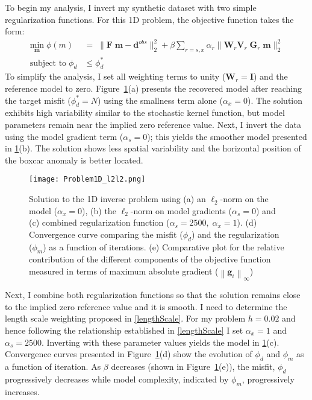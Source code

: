 To begin my analysis, I invert my synthetic dataset with two simple regularization functions. For this 1D problem, the objective function takes the form:
\begin{equation}
\begin{split}
\underset{\mathbf{m}}{\text{min}}\; \phi(m) & = \; \|\mathbf{F}\;\mathbf{m} - \mathbf{d}^{obs}\|_2^2 + \beta \sum_{r=s,x} \alpha_r \|\mathbf{W}_r \mathbf{V}_r \;\mathbf{G}_r \;\mathbf{m}\|_2^2 \\
\text{subject to} \; \phi_d & \leq \phi_d^* \;
\end{split}\label{1DLineObjFun}
\end{equation}
To simplify the analysis, I set all weighting terms to unity ($\mathbf{W}_r = \mathbf{I}$) and the reference model to zero.
Figure~\ref{Problem1D_l2Result}(a) presents the recovered model after reaching the target misfit ($\phi_d^*=N$) using the smallness term alone ($\alpha_x=0$). The solution exhibits high variability similar to the stochastic kernel function, but model parameters remain near the implied zero reference value. Next, I invert the data using the model gradient term ($\alpha_s=0$); this yields the smoother model presented in \ref{Problem1D_l2Result}(b). The solution shows less spatial variability and the horizontal position of the boxcar anomaly is better located.
\begin{figure}
\texttt{[image: Problem1D\_l2l2.png]}
\caption{Solution to the 1D inverse problem using (a) an $\ell_2$-norm on the model ($\alpha_x = 0$), (b) the $\ell_2$-norm on model gradients ($\alpha_s=0$) and (c) combined regularization function ($\alpha_s=2500,\;\alpha_x = 1$). (d) Convergence curve comparing the misfit ($\phi_d$) and the regularization ($\phi_m$) as a function of iterations. (e) Comparative plot for the relative contribution of the different components of the objective function measured in terms of maximum absolute gradient ($\left\| \mathbf{g}_i \right\|_\infty$)}
\label{Problem1D_l2Result}
\end{figure}

Next, I combine both regularization functions so that the solution remains close to the implied zero reference value and it is smooth.
I need to determine the length scale weighting proposed in \eqref{lengthScale}.
For my problem $h=0.02$ and hence following the relationship established in \eqref{lengthScale} I set $\alpha_x=1$ and $\alpha_s=2500$.
Inverting with these parameter values yields the model in \ref{Problem1D_l2Result}(c). Convergence curves presented in Figure~\ref{Problem1D_l2Result}(d) show the evolution of $\phi_d$ and $\phi_m$ as a function of iteration. As $\beta$ decreases (shown in Figure~\ref{Problem1D_l2Result}(e)), the misfit, $\phi_d$ progressively decreases while model complexity, indicated by $\phi_m$, progressively increases.

